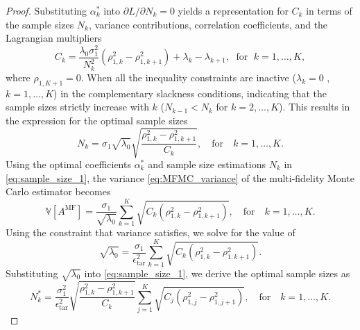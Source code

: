 \begin{proof}
Substituting $\alpha_k^*$ into $\partial L/\partial N_k=0$ yields a representation for $C_k$ in terms of the sample sizes $N_k$, variance contributions, correlation coefficients, and the Lagrangian multipliers
\begin{equation*}
    C_k=\frac{\lambda_0\sigma_1^2}{N_k^2}\left(\rho_{1,k}^2-\rho_{1,k+1}^2\right)+\lambda_k-\lambda_{k+1}, \;\text{ for }\; k=1,\ldots,K, 
\end{equation*}
where $\rho_{1,K+1} = 0$. When all the inequality constraints are inactive ($\lambda_k = 0$ , $k=1,\dots, K$) in the complementary slackness conditions, indicating that the sample sizes strictly increase with $k$ ($N_{k-1}< N_k$ for $k=2,\ldots, K$). This results in the expression for the optimal sample sizes
\begin{equation}
\label{eq:sample_size_1}
    N_k = \sigma_1\sqrt{\lambda_0}\sqrt{\frac{\rho_{1,k}^2-\rho_{1,k+1}^2}{C_k}},\quad \text{for}\quad  k=1,\ldots,K.
\end{equation}
Using the optimal coefficients $\alpha_k^*$ and sample size estimations $N_k$ in \eqref{eq:sample_size_1}, the variance \eqref{eq:MFMC_variance} of the multi-fidelity Monte Carlo estimator becomes
%
\begin{equation*} \label{eq:MFMC_variance2}
    \mathbb{V}\left[A^{\text{MF}}\right] = \frac{\sigma_1}{\sqrt{\lambda_0}}\sum_{k=1}^K\sqrt{C_k\left(\rho_{1,k}^2-\rho_{1,k+1}^2\right)}, \quad \text{for}\quad  k=1,\ldots,K.
\end{equation*}
%
Using the constraint that variance satisfies, we solve for the value of 
%
\[
\sqrt{\lambda_0} = \frac{\sigma_1}{\epsilon_{\text{tar}}^2}\sum_{k=1}^K\sqrt{C_k\left(\rho_{1,k}^2-\rho_{1,k+1}^2\right)}.
\]
%
Substituting $\sqrt{\lambda_0}$ into \eqref{eq:sample_size_1}, we derive the optimal sample sizes as
%
\[
N_k^* = \frac{\sigma_1^2}{\epsilon_{\text{tar}}^2}\sqrt{\frac{\rho_{1,k}^2-\rho_{1,k+1}^2}{C_k}}\sum_{j=1}^K\sqrt{C_j\left(\rho_{1,j}^2-\rho_{1,j+1}^2\right)},\quad \text{for}\quad  k=1,\ldots,K.
\]
%


\end{proof}
